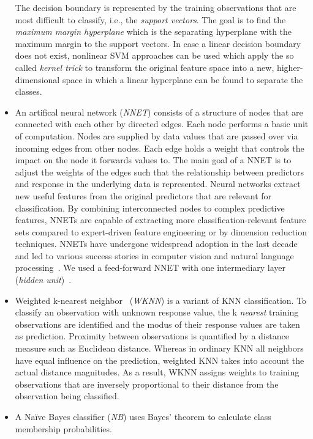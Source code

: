 \documentclass[
  oneside]{book}
\begin{document}
\begin{itemize}
  The decision boundary is represented by the training observations that are most difficult to classify, i.e., the \emph{support vectors}.
  The goal is to find the \emph{maximum margin hyperplane} which is the separating hyperplane with the maximum margin to the support vectors.
  In case a linear decision boundary does not exist, nonlinear SVM approaches can be used which apply the so called \emph{kernel trick} to transform the original feature space into a new, higher-dimensional space in which a linear hyperplane can be found to separate the classes.
\item
  An artifical neural network (\emph{NNET}) consists of a structure of nodes that are connected with each other by directed edges.
  Each node performs a basic unit of computation.
  Nodes are supplied by data values that are passed over via incoming edges from other nodes.
  Each edge holds a weight that controls the impact on the node it forwards values to.
  The main goal of a NNET is to adjust the weights of the edges such that the relationship between predictors and response in the underlying data is represented.
  Neural networks extract new useful features from the original predictors that are relevant for classification.
  By combining interconnected nodes to complex predictive features, NNETs are capable of extracting more classification-relevant feature sets compared to expert-driven feature engineering or by dimension reduction techniques.
  NNETs have undergone widespread adoption in the last decade and led to various success stories in computer vision and natural language processing~\autocite{Goodfellow:DL2016}. We used a feed-forward NNET with one intermediary layer (\emph{hidden unit})~\autocite{VenablesAndRipley:NNET2002}.
\item
  Weighted k-nearest neighbor~\autocite{Hechenbichler:wknn2004} (\emph{WKNN}) is a variant of KNN classification.
  To classify an observation with unknown response value, the k \emph{nearest} training observations are identified and the modus of their response values are taken as prediction.
  Proximity between observations is quantified by a distance measure such as Euclidean distance.
  Whereas in ordinary KNN all neighbors have equal influence on the prediction, weighted KNN takes into account the actual distance magnitudes.
  As a result, WKNN assigns weights to training observations that are inversely proportional to their distance from the observation being classified.
\item
  A Naïve Bayes classifier (\emph{NB}) uses Bayes' theorem to calculate class membership probabilities.

\end{itemize}
\end{document}
